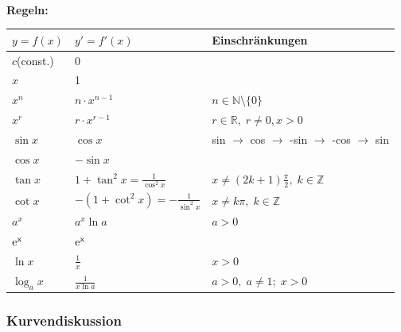 \documentclass[6pt,a4paper]{scrartcl}
\begin{document}
\begin{multicols*}{2}
\\
\textbf{Regeln:}\\
\begin{tabular}{l|l|l}
$ y=f(x) $		& $ y'=f'(x) $ 								& Einschränkungen 									\\
\hline
$ c $(const.)	& 0 																								\\	
$ x $			& 1																								\\
$ x^n $			& $ n \cdot x^{n-1} $						& $ n \in \mathbb N \setminus \{0\} $ 				\\
$ x^r $			& $ r \cdot x^{r-1} $						& $ r \in \mathbb R, \; r \neq 0, x>0 $ 				\\
$ \sin x $		& $ \cos x $ 								& sin $\rightarrow$ cos $\rightarrow$ -sin $\rightarrow$ -cos $\rightarrow$ sin\\	
$ \cos x $		& $ -\sin x $ 								&													\\
$ \tan x $		& $ 1+ \tan^2 x = \frac{1}{\cos^2 x} $		& $ x \neq (2k+1)\frac{\pi}{2}, \; k \in \mathbb Z $ 	\\
$ \cot x $		& $ -(1+ \cot^2 x) = - \frac{1}{\sin^2 x} $	& $ x \neq k \pi, \; k \in \mathbb Z $ 				\\
$ a^x $			& $ a^x \ln a $								& $ a>0 $ 											\\
$ \rm e^x $		& $ \rm e^x $ 								&													\\	
$ \ln x $		& $ \frac{1}{x} $							& $ x>0 $ 											\\
$ \log_a x $		& $ \frac{1}{x \ln a} $						& $ a>0, \; a \neq 1; \; x>0 $ 						\\
\end{tabular}

\subsubsection{Kurvendiskussion}


\end{multicols*}
\end{document}
